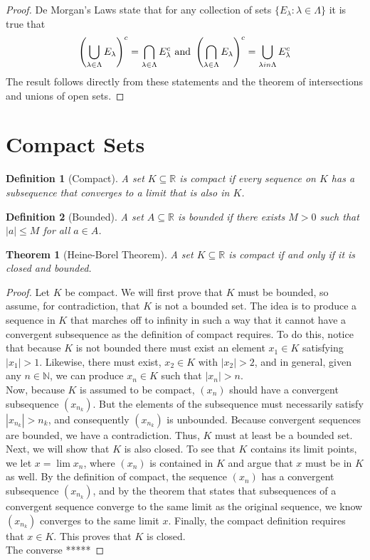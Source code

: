 \documentclass[10pt]{report}
\newtheorem{thm2}{Theorem}[section]
\newtheorem{def2}{Definition}[section]
\begin{document}
\begin{proof}
De Morgan's Laws state that for any collection of sets $\{E_\lambda :\lambda\in \Lambda\}$ it is true that
$$\left( \bigcup_{\lambda\in\Lambda} E_\lambda\right)^c = \bigcap_{\lambda\in\Lambda} E_\lambda^c \text{   and   } \left(\bigcap_{\lambda\in\Lambda} E_\lambda\right)^c = \bigcup_{\lambda\\in\Lambda} E_\lambda^c$$
The result follows directly from these statements and the theorem of intersections and unions of open sets. 
\end{proof}
\section{Compact Sets}
\begin{def2}[Compact]
A set $K\subseteq\mathbb{R}$ is compact if every sequence on $K$ has a subsequence that converges to a limit that is also in $K$.
\end{def2}
\begin{def2}[Bounded]
A set $A\subseteq\mathbb{R}$ is bounded if there exists $M>0$ such that $|a|\leq M$ for all $a\in A$.
\end{def2}
\begin{thm2}[Heine-Borel Theorem]
A set $K\subseteq\mathbb{R}$ is compact if and only if it is closed and bounded.
\end{thm2}
\begin{proof}
Let $K$ be compact. We will first prove that $K$ must be bounded, so assume, for contradiction, that $K$ is not a bounded set. The idea is to produce a sequence in $K$ that marches off to infinity in such a way that it cannot have a convergent subsequence as the definition of compact requires. To do this, notice that because $K$ is not bounded there must exist an element $x_1\in K$ satisfying $|x_1|>1$. Likewise, there must exist, $x_2\in K$ with $|x_2| > 2$, and in general, given any $n\in\mathbb{N}$, we can produce $x_n\in K$ such that $|x_n |>n$.\\
Now, because $K$ is assumed to be compact, $(x_n)$ should have a convergent subsequence $(x_{n_k})$. But the elements of the subsequence must necessarily satisfy $|x_{n_k}|>n_k$, and consequently $(x_{n_k})$ is unbounded. Because convergent sequences are bounded, we have a contradiction. Thus, $K$ must at least be a bounded set.\\
Next, we will show that $K$ is also closed. To see that $K$ contains its limit points, we let $x=\lim x_n$, where $(x_n)$ is contained in $K$ and argue that $x$ must be in $K$ as well. By the definition of compact, the sequence $(x_n)$ has a convergent subsequence $(x_{n_k})$, and by the theorem that states that subsequences of a convergent sequence converge to the same limit as the original sequence, we know $(x_{n_k})$ converges to the same limit $x$. Finally, the compact definition requires that $x\in K$. This proves that $K$ is closed.\\
The converse *****
\end{proof}
\end{document}
